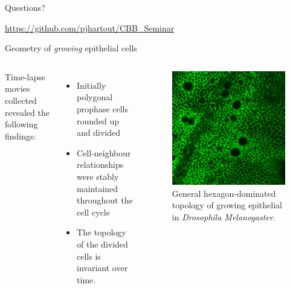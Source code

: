 \documentclass[aspectratio=169, 10pt]{beamer}
\begin{document}
\begin{frame}[standout]
  Questions?
  \vspace{3cm}
  \begin{center}{\Large {}} \normalsize\url{https://github.com/pjhartout/CBB_Seminar}\end{center}
\end{frame}

\appendix

\begin{frame}[fragile]{Geometry of \emph{growing} epithelial cells}    
    
  \begin{columns}[onlytextwidth]
      Time-lapse movies collected revealed the following findings:
        \begin{itemize}
          \item Initially polygonal prophase cells rounded up and divided
          \item Cell-neighbour relationships were stably maintained throughout the cell cycle
          \item The topology of the divided cells is invariant over time.
        \end{itemize}
     
       
          \begin{figure}
              \centering
              \includegraphics[width=.7\textwidth]{figures/supfig1.png}
              \caption{General hexagon-dominated topology of growing epithelial in \emph{Drosophila Melanogaster}.}
              \label{}
          \end{figure}
  \end{columns}
\end{frame}
\end{document}
